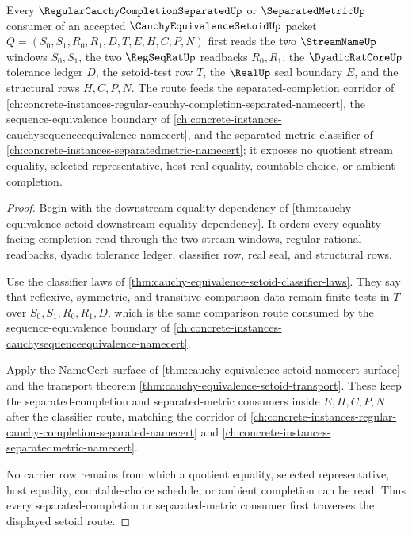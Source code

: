 \begin{theorem}
\label{thm:cauchy-equivalence-setoid-separated-completion-forward-link}
Every $\RegularCauchyCompletionSeparatedUp$ or $\SeparatedMetricUp$ consumer of an accepted $\CauchyEquivalenceSetoidUp$ packet $Q=(S_0,S_1,R_0,R_1,D,T,E,H,C,P,N)$ first reads the two $\StreamNameUp$ windows $S_0,S_1$, the two $\RegSeqRatUp$ readbacks $R_0,R_1$, the $\DyadicRatCoreUp$ tolerance ledger $D$, the setoid-test row $T$, the $\RealUp$ seal boundary $E$, and the structural rows $H,C,P,N$. The route feeds the separated-completion corridor of \autoref{ch:concrete-instances-regular-cauchy-completion-separated-namecert}, the sequence-equivalence boundary of \autoref{ch:concrete-instances-cauchysequenceequivalence-namecert}, and the separated-metric classifier of \autoref{ch:concrete-instances-separatedmetric-namecert}; it exposes no quotient stream equality, selected representative, host real equality, countable choice, or ambient completion.
\end{theorem}
\begin{proof}
Begin with the downstream equality dependency of \autoref{thm:cauchy-equivalence-setoid-downstream-equality-dependency}. It orders every equality-facing completion read through the two stream windows, regular rational readbacks, dyadic tolerance ledger, classifier row, real seal, and structural rows.

Use the classifier laws of \autoref{thm:cauchy-equivalence-setoid-classifier-laws}. They say that reflexive, symmetric, and transitive comparison data remain finite tests in $T$ over $S_0,S_1,R_0,R_1,D$, which is the same comparison route consumed by the sequence-equivalence boundary of \autoref{ch:concrete-instances-cauchysequenceequivalence-namecert}.

Apply the NameCert surface of \autoref{thm:cauchy-equivalence-setoid-namecert-surface} and the transport theorem \autoref{thm:cauchy-equivalence-setoid-transport}. These keep the separated-completion and separated-metric consumers inside $E,H,C,P,N$ after the classifier route, matching the corridor of \autoref{ch:concrete-instances-regular-cauchy-completion-separated-namecert} and \autoref{ch:concrete-instances-separatedmetric-namecert}.

No carrier row remains from which a quotient equality, selected representative, host equality, countable-choice schedule, or ambient completion can be read. Thus every separated-completion or separated-metric consumer first traverses the displayed setoid route.
\end{proof}

